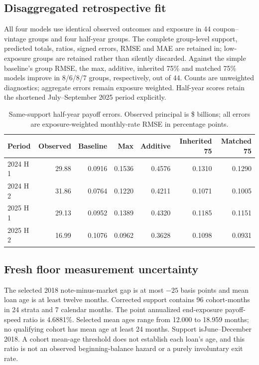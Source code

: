 \subsection{Disaggregated retrospective fit}
All four models use identical observed outcomes and exposure in 44 coupon--vintage groups and four half-year groups. The complete group-level support, predicted totals, ratios, signed errors, RMSE and MAE are retained in; low-exposure groups are retained rather than silently discarded. Against the simple baseline's group RMSE, the max, additive, inherited 75\% and matched 75\% models improve in 8/6/8/7 groups, respectively, out of 44. Counts are unweighted diagnostics; aggregate errors remain exposure weighted. Half-year scores retain the shortened July--September 2025 period explicitly.

\begin{table}[H]\centering\scriptsize
\caption{Same-support half-year payoff errors. Observed principal is \$ billions; all errors are exposure-weighted monthly-rate RMSE in percentage points.}\label{tab:correctedhalves}
\begin{tabular}{@{}lrrrrrr@{}}\toprule
Period & Observed & Baseline & Max & Additive & Inherited 75 & Matched 75\\\midrule
2024 H 1 & 29.88 & 0.0916 & 0.1536 & 0.4576 & 0.1310 & 0.1290\\
2024 H 2 & 31.86 & 0.0764 & 0.1220 & 0.4211 & 0.1071 & 0.1005\\
2025 H 1 & 29.13 & 0.0952 & 0.1389 & 0.4320 & 0.1185 & 0.1151\\
2025 H 2 & 16.99 & 0.1076 & 0.0962 & 0.3628 & 0.1098 & 0.0931\\
\bottomrule\end{tabular}\end{table}

\subsection{Fresh floor measurement uncertainty}
The selected 2018 note-minus-market gap is at most $-25$ basis points and mean loan age is at least twelve months. Corrected support contains 96 cohort-months in 24 strata and 7 calendar months. The point annualized end-exposure payoff-speed ratio is 4.6881\%. Selected mean ages range from 12.000 to 18.959 months; no qualifying cohort has mean age at least 24 months. Support isJune--December 2018. A cohort mean-age threshold does not establish each loan's age, and this ratio is not an observed beginning-balance hazard or a purely involuntary exit rate.

